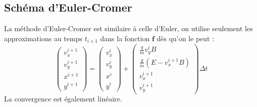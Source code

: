 \documentclass[a4paper,12pt,oneside]{article}
\def \be {\begin{equation}}
\def \ee {\end{equation}}
\begin{document}
\subsection{Schéma d'Euler-Cromer \cite{notesDeCours}}
La méthode d'Euler-Cromer est similaire à celle d'Euler, on utilise seulement les approximations au temps $t_{i+1}$ dans la fonction $\textbf{f}$ dès qu'on le peut :
\be
\left( \begin{array}{c} v_x^{i+1} \\ v_y^{i+1} \\ x^{i+1} \\ y^{i+1} \end{array} \right) =\left( \begin{array}{c} v_x^{i} \\ v_y^{i} \\ x^{i} \\ y^{i} \end{array} \right)
+ \left( \begin{array}{c}
   \frac{q}{m} v_y^{i} B\\ \frac{q}{m} (E-v_x^{i+1} B) \\ 
   v_x^{i+1} \\ v_y^{i+1}
\end{array} \right) \Delta t
\ee
La convergence est également linéaire.
\label{paraEulerC}
\end{document}
